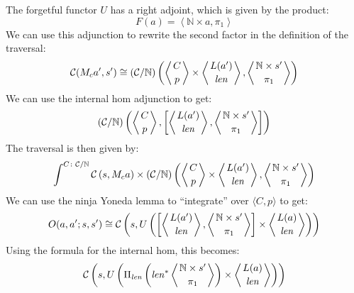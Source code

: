 \documentclass[11pt]{amsart}
\begin{document}
  
The forgetful functor $U$ has a right adjoint, which is given by the product:
\[F(a) = \left \langle \mathbb{N} \times a, \pi_1 \right \rangle\]
We can use this adjunction to rewrite the second factor in the definition of the traversal:
\[ \mathcal{C}(M_c a' , s') 
 \cong  
(\mathcal{C}/\mathbb{N})\left(\left \langle {C \atop p} \right \rangle \times \left \langle {L(a') \atop \mathit{len}} \right \rangle, \left \langle {\mathbb{N} \times s' \atop \pi_1} \right \rangle \right) \]
We can use the internal hom adjunction to get:
\[ 
(\mathcal{C}/\mathbb{N})\left(\left \langle {C \atop p} \right \rangle, \left[ \left \langle {L(a') \atop \mathit{len}} \right \rangle, \left \langle {\mathbb{N} \times s' \atop \pi_1} \right \rangle \right] \right) \]
The traversal is then given by:
\[ \int^{C \colon \mathcal{C}/\mathbb{N}} \mathcal{C} 
\left(s,  M_c a \right)  
  \times (\mathcal{C}/\mathbb{N})\left( \left \langle {C \atop p} \right \rangle 
  \times \left \langle {L(a') \atop \mathit{len}} \right \rangle, \left \langle {\mathbb{N} \times s' \atop \pi_1} \right \rangle \right) \]
We can use the ninja Yoneda lemma to ``integrate'' over $\langle C, p \rangle$ to get:
\[ O(a, a'; s, s') \cong \mathcal{C} \left(  s, U\left( 
  \left[ \left \langle {L(a') \atop \mathit{len}} \right \rangle, \left \langle {\mathbb{N} \times s' \atop \pi_1} \right \rangle \right] \times \left \langle {L(a) \atop \mathit{len}} \right \rangle \right) \right) \]
Using the formula for the internal hom, this becomes:
\[ \mathcal{C} \left(  s, U\left( \Pi_{\mathit{len}} \left( \mathit{len}^*
   \left \langle {\mathbb{N} \times s' \atop \pi_1} \right \rangle \right) \times \left \langle {L(a) \atop \mathit{len}} \right \rangle \right) \right) \]
\end{document}
